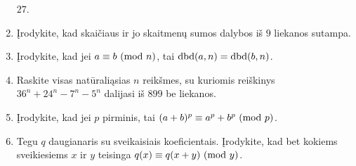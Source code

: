 \begin{enumerate}
    $27$.
  \item Įrodykite, kad skaičiaus ir jo skaitmenų sumos dalybos iš $9$
    liekanos sutampa.  
  \item Įrodykite, kad jei $a \equiv b \ (\text{mod } n)$, tai $\operatorname{dbd}(a,n) = \operatorname{dbd}(b,n)$.
  \item \text{[LitKo 2003]} Raskite visas natūraliąsias $n$ reikšmes, su
    kuriomis reiškinys $36^n + 24^n - 7^n -5^n$ dalijasi iš $899$ be
    liekanos.
  \item Įrodykite, kad jei $p$ pirminis, tai $(a+b)^p \equiv a^p + b^p
    \ (\text{mod } p)$. 
  \item Tegu $q$ daugianaris su sveikaisiais koeficientais. Įrodykite, kad
    bet kokiems sveikiesiems $x$ ir $y$ teisinga $q(x) \equiv q(x+y) \ (\text{mod } y)$.

\end{enumerate}
